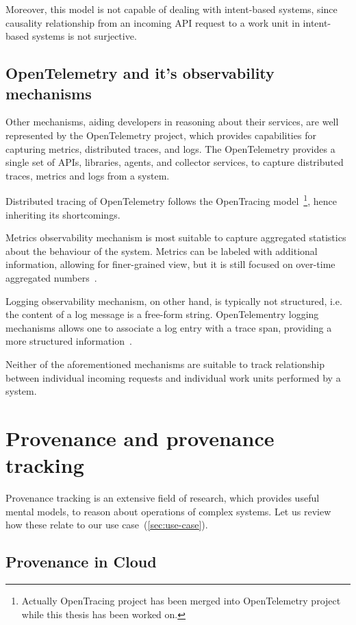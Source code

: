Moreover, this model is not capable of dealing with intent-based systems, since causality relationship from an incoming API request to a work unit in intent-based systems is not surjective.

\subsection{OpenTelemetry and it's observability mechanisms} 

Other mechanisms, aiding developers in reasoning about their services, are well represented by the OpenTelemetry project, which provides capabilities for capturing metrics, distributed traces, and logs. The OpenTelemetry provides a single set of APIs, libraries, agents, and collector services, to capture distributed traces, metrics and logs from a system. 

Distributed tracing of OpenTelemetry follows the OpenTracing model~\footnote{Actually OpenTracing project has been merged into OpenTelemetry project while this thesis has been worked on.}, hence inheriting its shortcomings.

Metrics observability mechanism is most suitable to capture aggregated statistics about the behaviour of the system.  Metrics can be labeled with additional information, allowing for finer-grained view, but it is still focused on over-time aggregated numbers~\cite{prometheus-turnbull2018monitoring}.

Logging observability mechanism, on other hand, is typically not structured, i.e. the content of a log message is a free-form string.  OpenTelementry logging mechanisms allows one to associate a log entry with a trace span, providing a more structured information~\cite{opentelemetry-logging-Grinshteyn2020Feb}.

Neither of the aforementioned mechanisms are suitable to track relationship between individual incoming requests and individual work units performed by a system.

\section{Provenance and provenance tracking}

Provenance tracking is an extensive field of research, which provides useful mental models, to reason about operations of complex systems. Let us review how these relate to our use case~(\cref{sec:use-case}).

\subsection{Provenance in Cloud}

